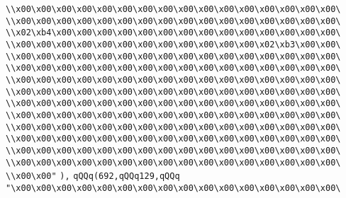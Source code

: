 \verb|\\x00\x00\x00\x00\x00\x00\x00\x00\x00\x00\x00\x00\x00\x00\x00\x00\|\newline
\verb|\\x00\x00\x00\x00\x00\x00\x00\x00\x00\x00\x00\x00\x00\x00\x00\x00\|\newline
\verb|\\x02\xb4\x00\x00\x00\x00\x00\x00\x00\x00\x00\x00\x00\x00\x00\x00\|\newline
\verb|\\x00\x00\x00\x00\x00\x00\x00\x00\x00\x00\x00\x00\x02\xb3\x00\x00\|\newline
\verb|\\x00\x00\x00\x00\x00\x00\x00\x00\x00\x00\x00\x00\x00\x00\x00\x00\|\newline
\verb|\\x00\x00\x00\x00\x00\x00\x00\x00\x00\x00\x00\x00\x00\x00\x00\x00\|\newline
\verb|\\x00\x00\x00\x00\x00\x00\x00\x00\x00\x00\x00\x00\x00\x00\x00\x00\|\newline
\verb|\\x00\x00\x00\x00\x00\x00\x00\x00\x00\x00\x00\x00\x00\x00\x00\x00\|\newline
\verb|\\x00\x00\x00\x00\x00\x00\x00\x00\x00\x00\x00\x00\x00\x00\x00\x00\|\newline
\verb|\\x00\x00\x00\x00\x00\x00\x00\x00\x00\x00\x00\x00\x00\x00\x00\x00\|\newline
\verb|\\x00\x00\x00\x00\x00\x00\x00\x00\x00\x00\x00\x00\x00\x00\x00\x00\|\newline
\verb|\\x00\x00\x00\x00\x00\x00\x00\x00\x00\x00\x00\x00\x00\x00\x00\x00\|\newline
\verb|\\x00\x00\x00\x00\x00\x00\x00\x00\x00\x00\x00\x00\x00\x00\x00\x00\|\newline
\verb|\\x00\x00\x00\x00\x00\x00\x00\x00\x00\x00\x00\x00\x00\x00\x00\x00\|\newline
\verb|\\x00\x00"|\newline
\verb|),|\newline
\verb|qQQq(692,qQQq129,qQQq|\newline
\verb|"\x00\x00\x00\x00\x00\x00\x00\x00\x00\x00\x00\x00\x00\x00\x00\x00\|\newline
